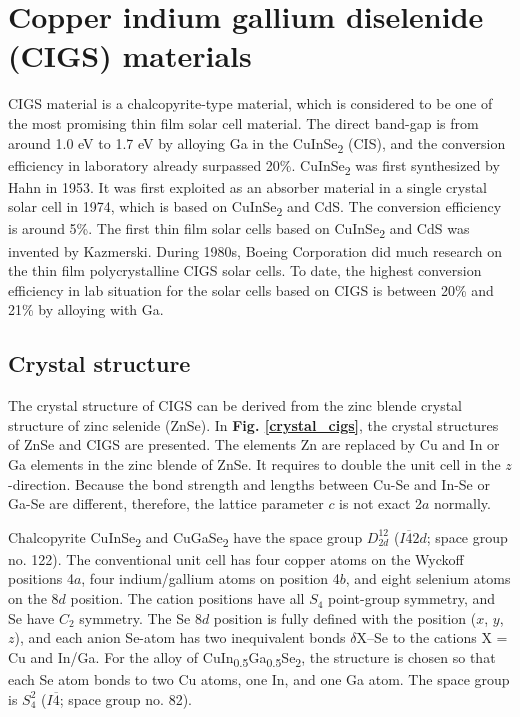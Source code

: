 \documentclass[a4paper, 12pt, titlepage,oneside,drop]{kthesis}
\begin{document}
\section{Copper indium gallium diselenide (CIGS) materials}
CIGS material is a chalcopyrite-type material, which is considered to be one of the most promising thin film solar cell material. The direct band-gap is from around 1.0 eV to 1.7 eV by alloying Ga in the CuInSe\textsubscript{2} (CIS),  and the conversion efficiency in laboratory already surpassed 20\%. 
CuInSe\textsubscript{2} was first synthesized by Hahn in 1953. It was first exploited as an absorber material in a single crystal solar cell in 1974, which is based on CuInSe\textsubscript{2} and CdS. The conversion efficiency is around 
5\%. The first thin film solar cells based on CuInSe\textsubscript{2} and CdS was invented by Kazmerski. During 1980s, Boeing Corporation did much research on the thin film polycrystalline CIGS solar cells. 
To date, the highest conversion efficiency in lab situation for the solar cells based on CIGS is between 20\% and 21\% by alloying with Ga.


\subsection{Crystal structure}
The crystal structure of CIGS can be derived from the zinc blende crystal structure of zinc selenide (ZnSe). In \textbf{Fig. \ref{crystal_cigs}}, the crystal structures of ZnSe and CIGS are presented. 
The elements Zn are replaced by Cu and In or Ga elements in the zinc blende of ZnSe. It requires to double the unit cell in the $z$-direction. Because the bond strength and lengths between
Cu-Se and In-Se or Ga-Se are different, therefore, the lattice parameter $c$ is not exact 2$a$ normally.

Chalcopyrite CuInSe\textsubscript{2} and CuGaSe\textsubscript{2} have the space group $D_{2d}^{12}$ ($I\overline{4}2d$; space group no. 122).
The conventional unit cell has four copper atoms on the Wyckoff positions 4$a$, four indium/gallium atoms on position 4$b$, and eight selenium atoms on the 8$d$ position. 
The cation positions have all $S_4$ point-group symmetry, and Se have $C_2$ symmetry. 
The Se 8$d$ position is fully defined with the position ($x$, $y$, $z$), and each anion Se-atom has two inequivalent bonds $\delta$X–Se to the cations X = Cu and In/Ga. 
For the alloy of CuIn\textsubscript{0.5}Ga\textsubscript{0.5}Se\textsubscript{2}, the structure is chosen so that each Se atom bonds to two Cu atoms, one In, and one Ga atom. The space group is $S_{4}^{2}$ ($I\overline{4}$; space 
group no. 82).
\end{document}

